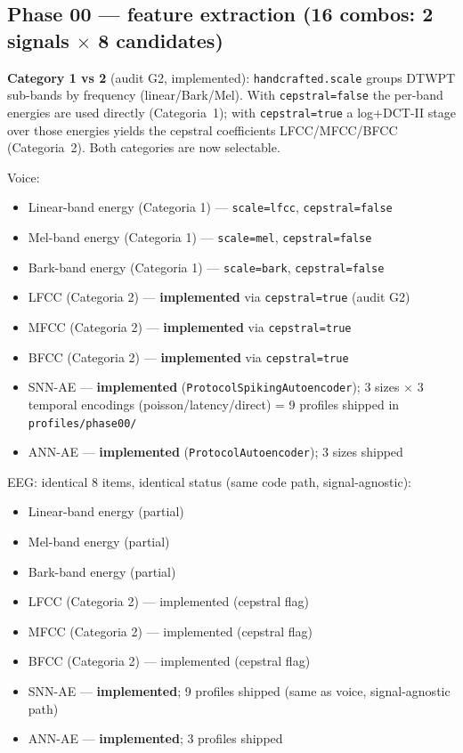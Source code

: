 \subsection*{Phase 00 --- feature extraction (16 combos: 2 signals $\times$ 8 candidates)}

\textbf{Category 1 vs 2} (audit G2, implemented): \texttt{handcrafted.scale} groups DTWPT sub-bands
by frequency (linear/Bark/Mel). With \texttt{cepstral=false} the per-band energies are used directly
(Categoria~1); with \texttt{cepstral=true} a log+DCT-II stage over those energies yields the cepstral
coefficients LFCC/MFCC/BFCC (Categoria~2). Both categories are now selectable.

Voice:
\begin{itemize}
    \item[$\blacksquare$] Linear-band energy (Categoria 1) --- \texttt{scale=lfcc}, \texttt{cepstral=false}
    \item[$\blacksquare$] Mel-band energy (Categoria 1) --- \texttt{scale=mel}, \texttt{cepstral=false}
    \item[$\blacksquare$] Bark-band energy (Categoria 1) --- \texttt{scale=bark}, \texttt{cepstral=false}
    \item[$\blacksquare$] LFCC (Categoria 2) --- \textbf{implemented} via \texttt{cepstral=true} (audit G2)
    \item[$\blacksquare$] MFCC (Categoria 2) --- \textbf{implemented} via \texttt{cepstral=true}
    \item[$\blacksquare$] BFCC (Categoria 2) --- \textbf{implemented} via \texttt{cepstral=true}
    \item[$\blacksquare$] SNN-AE --- \textbf{implemented} (\texttt{ProtocolSpikingAutoencoder}); 3 sizes $\times$ 3 temporal encodings (poisson/latency/direct) = 9 profiles shipped in \texttt{profiles/phase00/}
    \item[$\blacksquare$] ANN-AE --- \textbf{implemented} (\texttt{ProtocolAutoencoder}); 3 sizes shipped
\end{itemize}

EEG: identical 8 items, identical status (same code path, signal-agnostic):
\begin{itemize}
    \item[$\square$] Linear-band energy (partial) \quad
    \item[$\square$] Mel-band energy (partial) \quad
    \item[$\square$] Bark-band energy (partial)
    \item[$\blacksquare$] LFCC (Categoria 2) --- implemented (cepstral flag) \quad
    \item[$\blacksquare$] MFCC (Categoria 2) --- implemented (cepstral flag) \quad
    \item[$\blacksquare$] BFCC (Categoria 2) --- implemented (cepstral flag)
    \item[$\blacksquare$] SNN-AE --- \textbf{implemented}; 9 profiles shipped (same as voice, signal-agnostic path)
    \item[$\blacksquare$] ANN-AE --- \textbf{implemented}; 3 profiles shipped
\end{itemize}

